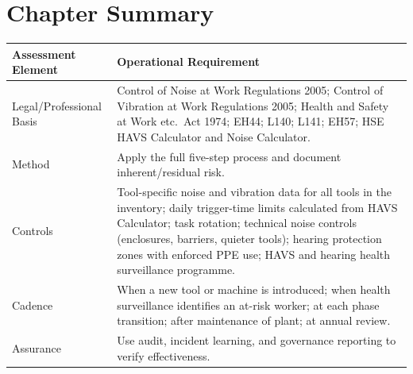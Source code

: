 \newpage
\section{Chapter Summary}

\begin{table}[H]
\centering
\begin{tabularx}{\textwidth}{>{\raggedright\arraybackslash}p{3.2cm}X}
\toprule
\textbf{Assessment Element} & \textbf{Operational Requirement} \\
\midrule
Legal/Professional Basis & Control of Noise at Work Regulations 2005; Control of Vibration at Work Regulations 2005; Health and Safety at Work etc.\ Act 1974; EH44; L140; L141; EH57; HSE HAVS Calculator and Noise Calculator. \\
Method & Apply the full five-step process and document inherent/residual risk. \\
Controls & Tool-specific noise and vibration data for all tools in the inventory; daily trigger-time limits calculated from HAVS Calculator; task rotation; technical noise controls (enclosures, barriers, quieter tools); hearing protection zones with enforced PPE use; HAVS and hearing health surveillance programme. \\
Cadence & When a new tool or machine is introduced; when health surveillance identifies an at-risk worker; at each phase transition; after maintenance of plant; at annual review. \\
Assurance & Use audit, incident learning, and governance reporting to verify effectiveness. \\
\bottomrule
\end{tabularx}
\end{table}

